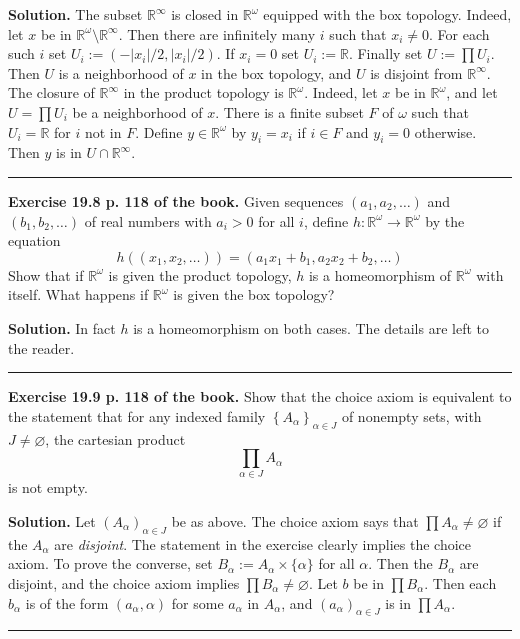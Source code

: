 \documentclass[12pt,letterpaper]{article}
\newcommand{\noi}{\noindent}%
\newcommand{\R}{\mathbb R}
\begin{document}
\noi\textbf{Solution.} The subset $\R^\infty$ is closed in $\R^\omega$ equipped with the box topology. Indeed, let $x$ be in $\R^\omega\setminus\R^\infty$. Then there are infinitely many $i$ such that $x_i\ne0$. For each such $i$ set $U_i:=(-|x_i|/2,|x_i|/2)$. If $x_i=0$ set $U_i:=\R$. Finally set $U:=\prod U_i$. Then $U$ is a neighborhood of $x$ in the box topology, and $U$ is disjoint from $\R^\infty$. The closure of $\R^\infty$ in the product topology is $\R^\omega$. Indeed, let $x$ be in $\R^\omega$, and let $U=\prod U_i$ be a neighborhood of $x$. There is a finite subset $F$ of $\omega$ such that $U_i=\R$ for $i$ not in $F$. Define $y\in\R^\omega$ by $y_i=x_i$ if $i\in F$ and $y_i=0$ otherwise. Then $y$ is in $U\cap\R^\infty$. 

\bigskip\hrule\medskip 

\noi\textbf{Exercise 19.8 p. 118 of the book.} Given sequences $\left(a_1, a_2, \ldots\right)$ and $\left(b_1, b_2, \ldots\right)$ of real numbers with $a_i>0$ for all $i$, define $h: \mathbb{R}^{\omega} \rightarrow \mathbb{R}^{\omega}$ by the equation
    \[
    h((x_1,x_2,\ldots))=(a_1x_1+b_1,a_2x_2+b_2,\ldots)
    \]
    Show that if $\mathbb{R}^{\omega}$ is given the product topology, $h$ is a homeomorphism of $\mathbb{R}^{\omega}$ with itself. What happens if $\mathbb{R}^{\omega}$ is given the box topology? 

\noi\textbf{Solution.} In fact $h$ is a homeomorphism on both cases. The details are left to the reader. 

\bigskip\hrule\medskip 

\noi\textbf{Exercise 19.9 p. 118 of the book.} Show that the choice axiom is equivalent to the statement that for any indexed family $\left\{A_\alpha\right\}_{\alpha\in J}$ of nonempty sets, with $J\ne\varnothing$, the cartesian product
    \[
    \prod_{\alpha \in J} A_{\alpha}
    \]
    is not empty. 

\noi\textbf{Solution.} Let $(A_\alpha)_{\alpha\in J}$ be as above. The choice axiom says that $\prod A_\alpha\ne\varnothing$ if the $A_\alpha$ are \emph{disjoint}. The statement in the exercise clearly implies the choice axiom. To prove the converse, set $B_\alpha:=A_\alpha\times\{\alpha\}$ for all $\alpha$. Then the $B_\alpha$ are disjoint, and the choice axiom implies $\prod B_\alpha\ne\varnothing$. Let $b$ be in $\prod B_\alpha$. Then each $b_\alpha$ is of the form $(a_\alpha,\alpha)$ for some $a_\alpha$ in $A_\alpha$, and $(a_\alpha)_{\alpha\in J}$ is in $\prod A_\alpha$. 

\bigskip\hrule\medskip 
\end{document}
